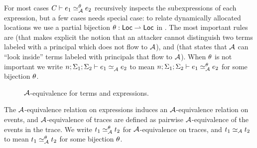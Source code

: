 For most cases $\loweq{C}{\Attacker}[\bijection]{\expr_1}{\expr_2}$ recursively inspects the subexpressions of each expression, but a few cases needs special case: to relate dynamically allocated locations we use a partial bijection \cite{Banerjee:2002:SIF:794201.795164, Rajani2018} $\theta: \mathsf{Loc} \rightharpoonup \mathsf{Loc}$ in . The most important rules are  (that makes explicit the notion that an attacker cannot distinguish two terms labeled with a principal which does not flow to $\mathcal{A}$), and  (that states that $\mathcal{A}$ can ``look inside'' terms labeled with principals that flow to $\mathcal{A}$). When $\theta$ is not important we write $\loweq{n; \env_1; \env_2}{\Attacker}{\expr_1}{\expr_2}$ to mean $\loweq{n; \env_1; \env_2}{\Attacker}[\bijection]{\expr_1}{\expr_2}$ for some bijection $\theta$.

\begin{figure}
    \centering
    \caption{$\mathcal{A}$-equivalence for terms and expressions.}
    \label{fig:low-eq-expr}
\end{figure}

The $\mathcal{A}$-equivalence relation on expressions induces an $\mathcal{A}$-equivalence relation on events, and $\mathcal{A}$-equivalence of traces are defined as pairwise $\mathcal{A}$-equivalence of the events in the trace. We write $t_1 \simeq_{\mathcal{A}}^{\theta} t_2$ for $\mathcal{A}$-equivalence on traces, and $t_1 \simeq_{\mathcal{A}} t_2$ to mean $t_1 \simeq_{\mathcal{A}}^{\theta} t_2$ for some bijection $\theta$.

